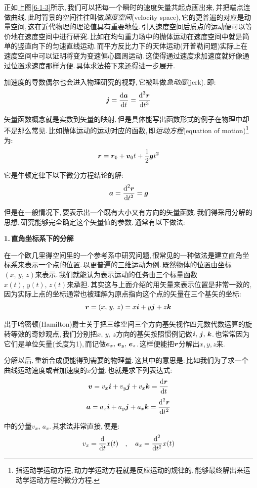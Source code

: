 正如上图\ref{6-1-3}所示,\,我们可以把每一个瞬时的速度矢量共起点画出来,\,并把端点连做曲线,\,此时背景的空间往往叫做\emph{速度空间}(velocity space),\,它的更普遍的对应是动量空间,\,这在近代物理的理论值具有重要地位.\,引入速度空间后质点的运动便可以等价地在速度空间中进行研究.\,比如在均匀重力场中的抛体运动在速度空间中就是简单的竖直向下的匀速直线运动.\,而平方反比力下的天体运动(开普勒问题)实际上在速度空间中可以证明将变为变速偏心圆周运动.\,这使得通过速度求加速度就好像通过位置求速度那样方便.\,具体求法接下来还得进一步展开.

加速度的导数偶尔也会进入物理研究的视野,\,它被叫做\emph{急动度}(jerk).\,即:
\[\boldsymbol{j}=\frac{\textrm{d} \boldsymbol{a}}{\textrm{d} t}=\frac{\textrm{d} ^3\boldsymbol{r}}{\textrm{d} t^3}\]

矢量函数概念就是实数到矢量的映射,\,但是具体能写出函数形式的例子在物理中却不是那么常见.\,比如抛体运动的运动对应的函数,\,即\emph{运动方程}(equation of motion)\footnote{指运动学运动方程,\,动力学运动方程就是反应运动的规律的,\,能够最终解出来运动学运动方程的微分方程.}为:
\[\boldsymbol{r}=\boldsymbol{r}_0+\boldsymbol{v}_0 t+\frac{1}{2}\boldsymbol{g}t^2\]

它是牛顿定律下以下微分方程结论的解:
\[\boldsymbol{a}=\frac{\textrm{d} ^2\boldsymbol{r}}{\textrm{d} t^2}=\boldsymbol{g}\]

但是在一般情况下,\,要表示出一个既有大小又有方向的矢量函数,\,我们得采用分解的思想,\,研究能够完全确定这个矢量值的参数.\,通常有以下做法:

\vspace{0.2cm}
{\bf 1.\,直角坐标系下的分解}

在一个欧几里得空间里的一个参考系中研究问题,\,很常见的一种做法是建立直角坐标系来表示一个点的位置.\,以更普遍的三维运动为例.\,既然物体的位置由坐标$(x,\,y,\,z)$来表示.\,我们就能认为表示运动的任务由三个标量函数$x(t),\,y(t),\,z(t)$来承担.\,其实这与上面介绍的用矢量来表示位置是非常一致的,\,因为实际上点的坐标通常也被理解为原点指向这个点的矢量在三个基矢的坐标:
\[\boldsymbol{r}=(x,\,y,\,z)=x\boldsymbol{i}+y\boldsymbol{j}+z\boldsymbol{k}\]

出于哈密顿(Hamilton)爵士关于把三维空间三个方向基矢视作四元数代数运算的旋转等效的奇妙观点,\,我们分别把$x,\,y,\,z$方向的基矢按照惯例记做$\boldsymbol{i},\,\boldsymbol{j},\,\boldsymbol{k}$.\,也常常因为它们是单位矢量(长度为1),\,而记做$\boldsymbol{e}_x,\,\boldsymbol{e}_y,\,\boldsymbol{e}_z$.\,这样便能把$\boldsymbol{r}$分解出$x$,\,$y$,\,$z$来.

分解以后,\,重新合成便能得到需要的物理量.\,这其中的意思是:\,比如我们为了求一个曲线运动速度或者加速度的$x$分量.\,也就是求下列表达式:
\[\boldsymbol{v}=v_x\boldsymbol{i}+v_y\boldsymbol{j}+v_x\boldsymbol{k}=\frac{\textrm{d} \boldsymbol{r}}{\textrm{d} t}\]
\[\boldsymbol{a}=a_x\boldsymbol{i}+a_y\boldsymbol{j}+a_x\boldsymbol{k}=\frac{\textrm{d}^2 \boldsymbol{r}}{\textrm{d} t^2}\]

中的分量$v_x,\,a_x$.\,其求法非常直接,\,便是:
\[v_x=\frac{\textrm{d} }{\textrm{d} t}x(t)\quad,\quad a_x=\frac{\textrm{d}^2 }{\textrm{d} t^2}x(t)\]

